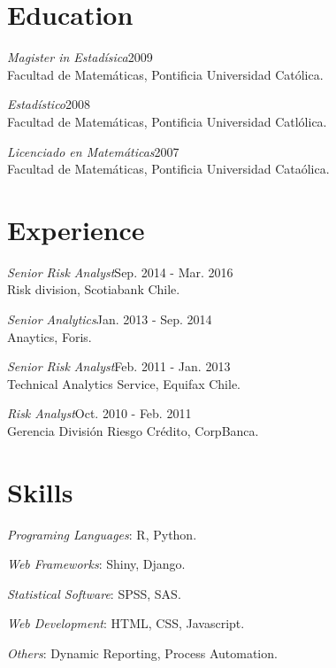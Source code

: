 \documentclass[margin]{res}
\begin{document}
\begin{resume}

\section{Education}

    {\sl Magister in Estadísica}\hfill 2009\\
    Facultad de Matemáticas, Pontificia Universidad Católica.

    {\sl Estadístico}\hfill 2008\\
    Facultad de Matemáticas, Pontificia Universidad Catlólica.

    {\sl Licenciado en Matemáticas}\hfill 2007\\
    Facultad de Matemáticas, Pontificia Universidad Cataólica.

\vspace{1cm}

\section{Experience}

    {\sl Senior Risk Analyst}\hfill Sep. 2014 - Mar. 2016\\
        Risk division, Scotiabank Chile.

    {\sl Senior Analytics}\hfill Jan. 2013 - Sep. 2014\\
    Anaytics, Foris.

    {\sl Senior Risk Analyst}\hfill Feb. 2011 - Jan. 2013\\
    Technical Analytics Service, Equifax Chile.

    {\sl Risk Analyst}\hfill Oct. 2010 - Feb. 2011\\
    Gerencia División Riesgo Crédito, CorpBanca.

\vspace{1cm}

\section{Skills}

    {\sl Programing Languages}: R, Python.

    {\sl Web Frameworks}: Shiny, Django.

    {\sl Statistical Software}: SPSS, SAS.
    
    {\sl Web Development}: HTML, CSS, Javascript.
    
    {\sl Others}: Dynamic Reporting, Process Automation.


\end{resume}
\end{document}
